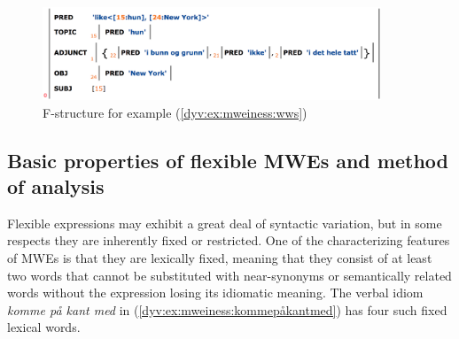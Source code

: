 \documentclass[output=paper]{langsci/langscibook}
\begin{document}
\begin{figure}
  \includegraphics[width=0.9\textwidth]{figures/wws-fstr}
  \caption{F-structure for example (\ref{dyv:ex:mweiness:wws})}
  \label{dyv:fig:mweiness:wws-fstr}
\end{figure}


%
%
%
%
%
%
%


\subsection{Basic properties of flexible MWEs and method of analysis}\label{dyv:sec:mweiness:flexexp}
Flexible expressions may exhibit a great deal of syntactic variation, but in some respects they are inherently fixed or restricted.
One of the characterizing features of MWEs is that they are lexically fixed, meaning that they consist of at least two words that cannot be substituted with near-synonyms or semantically related words without the expression losing its idiomatic meaning.
The verbal idiom \emph{komme på kant med} in (\ref{dyv:ex:mweiness:kommepåkantmed}) has four such fixed lexical words.
\end{document}
